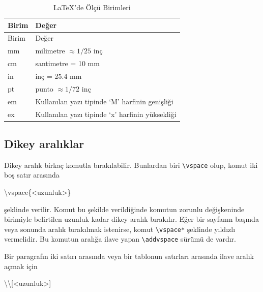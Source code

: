 \documentclass[
  10pt,
]{scrbook}
\newenvironment{Shaded}{}{}
\newcommand{\FunctionTok}[1]{\textcolor[rgb]{0.02,0.16,0.49}{#1}}
\newcommand{\NormalTok}[1]{#1}
\theoremstyle{definition}
\theoremstyle{definition}
\theoremstyle{definition}
\theoremstyle{definition}
\theoremstyle{remark}
\begin{document}
\begin{longtable}[]{@{}ll@{}}
\caption{\label{tab:olcubir} LaTeX'de Ölçü Birimleri}\tabularnewline
\toprule
Birim & Değer \\
\midrule
\endfirsthead
\toprule
Birim & Değer \\
\midrule
\endhead
mm & milimetre \(\approx 1/25\) inç \\
cm & santimetre = 10 mm \\
in & inç = 25.4 mm \\
pt & punto \(\approx 1/72\) inç \\
em & Kullanılan yazı tipinde `M' harfinin genişliği \\
ex & Kullanılan yazı tipinde `x' harfinin yüksekliği \\
\bottomrule
\end{longtable}

\hypertarget{dikey-aralux131klar}{%
\subsection{Dikey aralıklar}\label{dikey-aralux131klar}}

Dikey aralık birkaç komutla bırakılabilir. Bunlardan biri \texttt{\textbackslash{}vspace} olup, komut iki boş satır arasında

\begin{Shaded}
\begin{Highlighting}[]
\FunctionTok{\textbackslash{}vspace}\NormalTok{\{\textless{}uzunluk\textgreater{}\}}
\end{Highlighting}
\end{Shaded}

şeklinde verilir. Komut bu şekilde verildiğinde komutun zorunlu değişkeninde birimiyle belirtilen uzunluk kadar dikey aralık bırakılır. Eğer bir sayfanın başında veya sonunda aralık bırakılmak istenirse, komut \texttt{\textbackslash{}vspace*} şeklinde yıldızlı vermelidir. Bu komutun aralığa ilave yapan \texttt{\textbackslash{}addvspace} sürümü de vardır.

Bir paragrafın iki satırı arasında veya bir tablonun satırları arasında ilave aralık açmak için

\begin{Shaded}
\begin{Highlighting}[]
\FunctionTok{\textbackslash{}\textbackslash{}}\NormalTok{[\textless{}uzunluk\textgreater{}]}
\end{Highlighting}
\end{Shaded}
\end{document}
